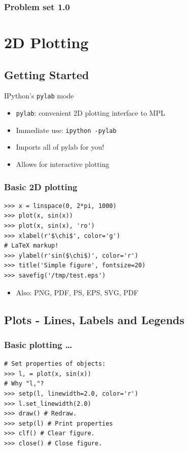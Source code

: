 \documentclass[14pt,compress]{beamer}
\newcounter{time}
\newcommand{\inctime}[1]{\addtocounter{time}{#1}{\tiny \thetime\ m}}
\newcommand{\typ}[1]{\texttt{#1}}
\begin{document}
\begin{frame}[fragile]
  \frametitle{Problem set 1.0}
\inctime{15}
\end{frame}

\section{2D Plotting}
\subsection{Getting Started}

\begin{frame}
    {IPython's \typ{pylab} mode}
\begin{itemize}
    \item \typ{pylab}: convenient 2D plotting interface to MPL
    \item Immediate use: \typ{ipython -pylab}
    \item Imports all of pylab for you!
    \item Allows for interactive plotting
\end{itemize}
\end{frame}

\begin{frame}[fragile]
    \frametitle{Basic 2D plotting}

\begin{lstlisting}
>>> x = linspace(0, 2*pi, 1000)
>>> plot(x, sin(x)) 
>>> plot(x, sin(x), 'ro')
>>> xlabel(r'$\chi$', color='g')
# LaTeX markup!
>>> ylabel(r'sin($\chi$)', color='r')
>>> title('Simple figure', fontsize=20)
>>> savefig('/tmp/test.eps')
\end{lstlisting}
\begin{itemize}
  \item Also: PNG, PDF, PS, EPS, SVG, PDF
\end{itemize}
\end{frame}
       
\subsection{Plots - Lines, Labels and Legends}
\begin{frame}[fragile]
  \frametitle{Basic plotting \ldots}
\begin{lstlisting}
# Set properties of objects:
>>> l, = plot(x, sin(x))
# Why "l,"?
>>> setp(l, linewidth=2.0, color='r')
>>> l.set_linewidth(2.0)
>>> draw() # Redraw.
>>> setp(l) # Print properties
>>> clf() # Clear figure.
>>> close() # Close figure.
\end{lstlisting}
\end{frame}
\end{document}
